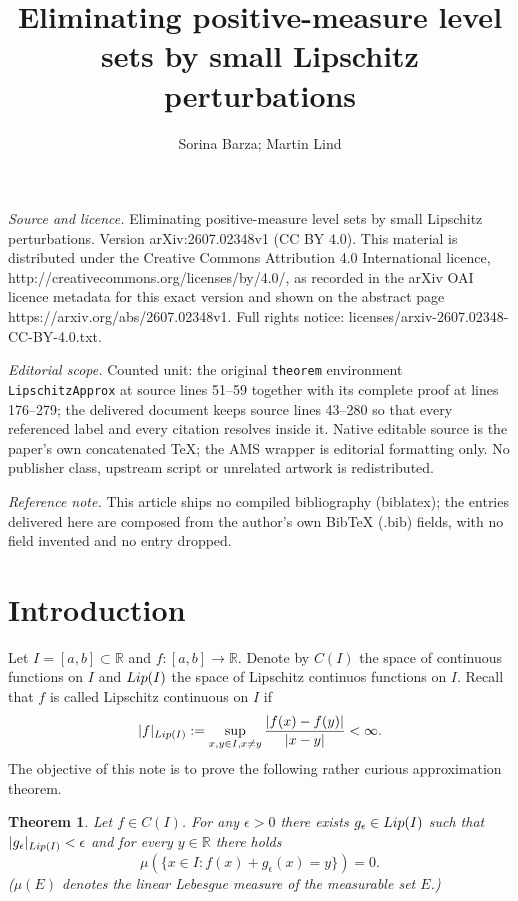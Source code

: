 \documentclass[10pt,a4paper]{amsart}
\newtheorem{theorem}{Theorem}[section]
\numberwithin{equation}{section}
\begin{document}
\title[Eliminating positive-measure level sets by small Lipschitz p]{Eliminating positive-measure level sets by small Lipschitz perturbations}
\author{Sorina Barza; Martin Lind}
\date{}
\maketitle
\noindent\emph{Source and licence.} Eliminating positive-measure level sets by small Lipschitz perturbations. Version arXiv:2607.02348v1 (CC BY 4.0). This material is distributed under the Creative Commons Attribution 4.0 International licence, http://creativecommons.org/licenses/by/4.0/, as recorded in the arXiv OAI licence metadata for this exact version and shown on the abstract page https://arxiv.org/abs/2607.02348v1. Full rights notice: licenses/arxiv-2607.02348-CC-BY-4.0.txt.\par\smallskip
\noindent\textit{Editorial scope.} Counted unit: the original \texttt{theorem} environment \texttt{LipschitzApprox} at source lines 51--59 together with its complete proof at lines 176--279; the delivered document keeps source lines 43--280 so that every referenced label and every citation resolves inside it. Native editable source is the paper's own concatenated TeX; the AMS wrapper is editorial formatting only. No publisher class, upstream script or unrelated artwork is redistributed.
\par\smallskip\noindent\textit{Reference note.} This article ships no compiled bibliography (biblatex); the entries delivered here are composed from the author's own BibTeX (.bib) fields, with no field invented and no entry dropped.
\section{Introduction}

Let $I=[a,b]\subset\mathbb{R}$ and $f:[a,b]\rightarrow\mathbb{R}$. Denote by $C(I)$ the space of continuous functions on $I$ and ${\rm Lip}(I)$ the space of Lipschitz continuos functions on $I$. Recall that $f$ is called Lipschitz continuous on $I$ if  
\begin{equation}
    \nonumber
    |f|_{{\rm Lip}(I)}:=\sup_{x,y\in I, x\neq y}\frac{|f(x)-f(y)|}{|x-y|}<\infty.
\end{equation}
The objective of this note is to prove the following rather curious approximation theorem.

\begin{theorem}
    \label{LipschitzApprox}
    Let $f\in C(I)$. For any $\epsilon>0$ there exists $g_\epsilon\in{\rm Lip}(I)$ such that $|g_\epsilon|_{{\rm Lip}(I)}<\epsilon$ and for every $y\in\mathbb{R}$ there holds
    \begin{equation}
        \nonumber
        \mu(\{x\in I:f(x)+g_\epsilon(x)=y\})=0.
    \end{equation}
    ($\mu(E)$ denotes the linear Lebesgue measure of the measurable set $E$.)
\end{theorem}
\end{document}
